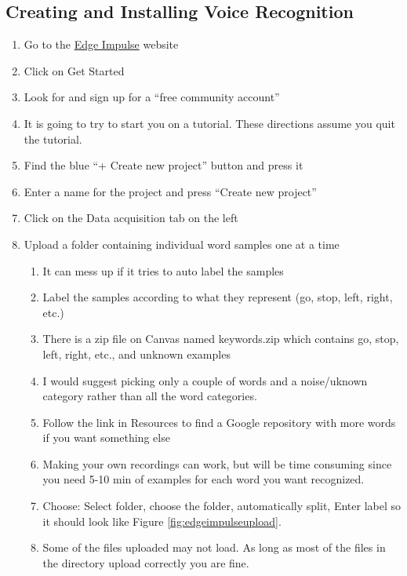 \subsection{Creating and Installing Voice Recognition}
\begin{enumerate}
  \item Go to the \href{https://edgeimpulse.com/}{Edge Impulse} website 
  \item Click on Get Started
  \item Look for and sign up for a ``free community account''
  \item It is going to try to start you on a tutorial. These directions assume you quit 
      the tutorial.
  \item Find the blue ``+ Create new project'' button and press it 
  \item Enter a name for the project and press ``Create new project''
  \item Click on the Data acquisition tab on the left
  \item Upload a folder containing individual word samples one at a time
  \begin{enumerate}
    \item It can mess up if it tries to auto label the samples
    \item Label the samples according to what they represent (go, stop, left, right, etc.)
    \item There is a zip file on Canvas named keywords.zip which contains go, stop, left, right, etc., and unknown examples
    \item I would suggest picking only a couple of words and a noise/uknown category rather than all the word categories.
    \item Follow the link in Resources to find a Google repository with more words if you want something else
    \item Making your own recordings can work, but will be time consuming since you need 5-10 min of examples 
            for each word you want recognized.
    \item Choose: Select folder, choose the folder, automatically split, Enter label so it should look 
            like Figure \ref{fig:edgeimpulseupload}.
    \item Some of the files uploaded may not load. As long as most of the files in the directory upload
            correctly you are fine.


\end{enumerate}
\end{enumerate}
